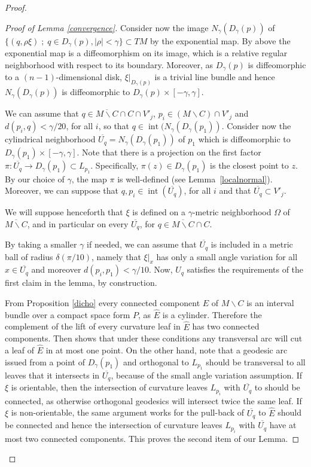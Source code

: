\documentclass[10pt]{amsart}
\let\moins\smallsetminus
\DeclareMathOperator{\inte}{int}
\newcommand{\sep}{\;;\;}
\theoremstyle{definition}
\theoremstyle{remark}
\numberwithin{equation}{section}
\begin{document}
\begin{proof}
\begin{proof}[Proof of Lemma \ref{convergence}]
Consider now the image $N_{\gamma}(D_{\gamma}(p))$ of
$\{(q, \rho\xi)\sep q\in D_{\gamma}(p), |\rho| < \gamma\}\subset TM$ by the exponential map.
By above the exponential map is a diffeomorphism on its image, which is a
relative regular neighborhood with respect to its boundary.
Moreover, as $D_{\gamma}(p)$ is diffeomorphic to a $(n-1)$-dimensional disk,
$\xi|_{D_{\gamma}(p)}$ is a trivial line bundle and hence $N_{\gamma}(D_{\gamma}(p))$ is diffeomorphic to
$D_{\gamma}(p)\times [-\gamma, \gamma]$.

We can assume that $q\in \overline{M\moins C}\cap C\cap V'_j$, $p_i\in (M\moins C)\cap V'_j$ and
$d(p_i,q) < \gamma/20$, for all $i$, so that $q\in \inte (N_{\gamma}(D_{\gamma}(p_1))$.
Consider now the cylindrical neighborhood $\overline{U_q}= N_{\gamma}(D_{\gamma}(p_1))$ of $p_1$ which is diffeomorphic to
$D_{\gamma}(p_1)\times [-\gamma, \gamma]$.
Note that there is a projection on the first factor $\pi: \overline{U_q}\to D_{\gamma}(p_1)\subset L_{p_1}$. Specifically,
$\pi(z)\in D_{\gamma}(p_1)$ is the closest point to $z$. By our choice of $\gamma$, the map $\pi$ is well-defined (see Lemma~\ref{localnormal}).
Moreover, we can suppose that $q, p_i\in \inte (\overline{U_q})$, for all $i$ and that $\overline{U_q}\subset V'_j$.

We will suppose henceforth that $\xi$ is defined on a $\gamma$-metric neighborhood $\Omega$ of $\overline{M\moins C}$, and in
particular on every $\overline{U_q}$, for $q\in \overline{M\moins C}\cap C$.

By taking a smaller $\gamma$ if needed, we can assume that
$\overline{U_q}$ is included in a metric ball of radius $\delta(\pi/10)$, namely that
$\xi|_x$ has only a small angle variation for all $x\in \overline{U_q}$ and moreover
$d(p_i,p_1)<\gamma/10$. Now, $U_q$ satisfies the requirements of the first claim in the lemma, by construction.

From Proposition \ref{dicho} every connected component $E$ of $M\moins C$ is an interval bundle over a compact space form $P$, as $\widehat{E}$ is a cylinder.
Therefore the complement of the lift of every curvature leaf in $\widehat{E}$ has two connected components.
Then \cite[Lem.\,2, p.\,385]{Hae} shows that under these conditions any transversal arc will cut a leaf of $\widehat{E}$ in at most one point.
On the other hand, note that a geodesic arc issued from a point of $D_{\gamma}(p_1)$ and orthogonal to $L_{p_1}$ should be
transversal to all leaves that it intersects in $\overline{U_q}$, because of the small angle variation assumption.
If $\xi$ is orientable, then the intersection of curvature leaves $L_{p_i}$ with $\overline{U_q}$ to should be connected,
as otherwise orthogonal geodesics will intersect twice the same leaf. If $\xi$ is non-orientable, the same argument works for the pull-back
of $\overline{U_q}$ to $\widehat{E}$ should be connected and hence the intersection of curvature leaves $L_{p_i}$ with $\overline{U_q}$
have at most two connected components. This proves the second item of our Lemma.


\end{proof}
\end{proof}
\end{document}
